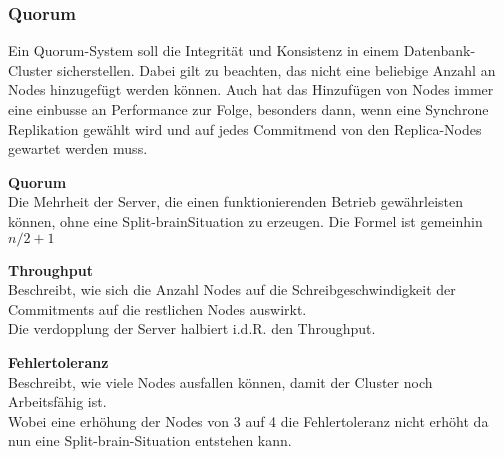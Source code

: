 
\subsubsection{Quorum}
\label{subsubsec:quorum}
\begin{flushleft}
    Ein Quorum-System soll die Integrität und Konsistenz in einem Datenbank-Cluster sicherstellen.
    Dabei gilt zu beachten, das nicht eine beliebige Anzahl an Nodes hinzugefügt werden können.
    Auch hat das Hinzufügen von Nodes immer eine einbusse an Performance zur Folge, besonders dann, wenn eine Synchrone Replikation gewählt wird und auf jedes Commitmend von den Replica-Nodes gewartet werden muss.

    \begin{description}
        \item \textbf{Quorum}\hfill \\Die Mehrheit der Server, die einen funktionierenden Betrieb gewährleisten können, ohne eine \Gls{Split-brain}Situation zu erzeugen.
        Die Formel ist gemeinhin \(n/2 + 1\)
        \item \textbf{Throughput}\hfill \\Beschreibt, wie sich die Anzahl Nodes auf die Schreibgeschwindigkeit der Commitments auf die restlichen Nodes auswirkt.\\Die verdopplung der Server halbiert i.d.R. den Throughput.
        \item \textbf{Fehlertoleranz}\hfill \\Beschreibt, wie viele Nodes ausfallen können, damit der Cluster noch Arbeitsfähig ist.\\Wobei eine erhöhung der Nodes von 3 auf 4 die Fehlertoleranz nicht erhöht da nun eine \Gls{Split-brain}-Situation entstehen kann.
    \end{description}

\end{flushleft}
